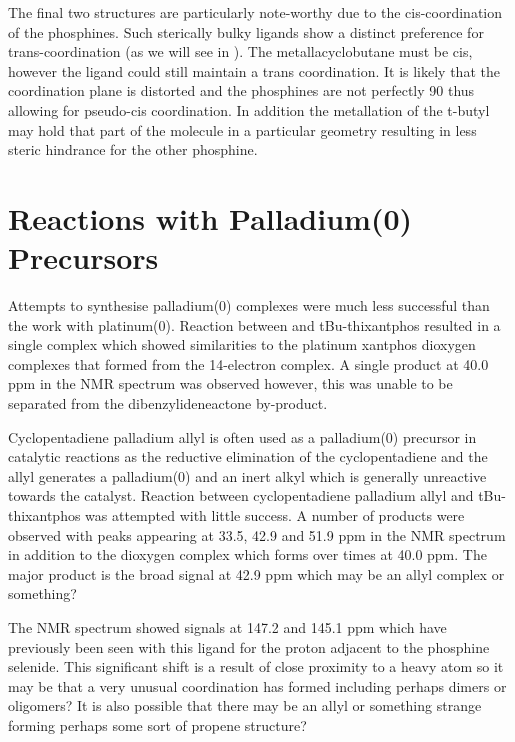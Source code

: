 The final two structures are particularly note-worthy due to the cis-coordination of the phosphines.  Such sterically bulky ligands show a distinct preference for trans-coordination (as we will see in ).  The metallacyclobutane must be cis, however the ligand could still maintain a trans coordination.  It is likely that the coordination plane is distorted and the phosphines are not perfectly 90 \degrees{} thus allowing for pseudo-cis coordination.  In addition the metallation of the t-butyl may hold that part of the molecule in a particular geometry resulting in less steric hindrance for the other phosphine.  


\section{Reactions with Palladium(0) Precursors}

Attempts to synthesise palladium(0) complexes were much less successful than the work with platinum(0).  Reaction between  and tBu-thixantphos resulted in a single complex which showed similarities to the platinum xantphos dioxygen complexes that formed from the 14-electron complex.  A single product at 40.0 ppm in the \phosphorus{} NMR spectrum was observed however, this was unable to be separated from the dibenzylideneactone by-product.

Cyclopentadiene palladium allyl is often used as a palladium(0) precursor in catalytic reactions as the reductive elimination of the cyclopentadiene and the allyl generates a palladium(0) and an inert  alkyl which is generally unreactive towards the catalyst.  Reaction between cyclopentadiene palladium allyl and tBu-thixantphos was attempted with little success.  A number of products were observed with peaks appearing at 33.5, 42.9 and 51.9 ppm in the \phosphorus{} NMR spectrum in addition to the dioxygen complex which forms over times at 40.0 ppm.  The major product is the broad signal at 42.9 ppm which may be an allyl complex or something?

The \carbon{} NMR spectrum showed signals at 147.2 and 145.1 ppm which have previously been seen with this ligand for the proton adjacent to the phosphine selenide.  This significant shift is a result of close proximity to a heavy atom so it may be that a very unusual coordination has formed including perhaps dimers or oligomers?  It is also possible that there may be an allyl or something strange forming  perhaps some sort of propene structure?

